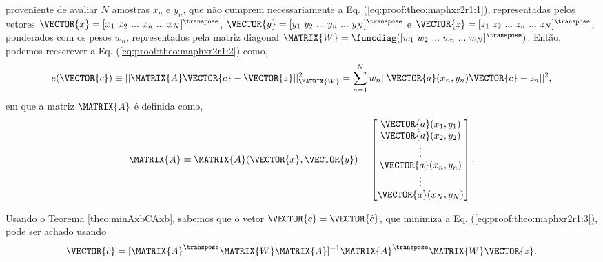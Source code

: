 \begin{myproofT}
\begin{equation}
\end{equation}
proveniente de avaliar $N$ amostras $x_n$ e $y_n$, 
que não cumprem necessariamente a Eq. (\ref{eq:proof:theo:maphxr2r1:1}), 
representadas pelos vetores 
$\VECTOR{x}=[x_1~ x_2~ ...~ x_n~ ...~ x_N]^{\transpose}$,
$\VECTOR{y}=[y_1~ y_2~ ...~ y_n~ ...~ y_N]^{\transpose}$ e 
$\VECTOR{z}=[z_1~ z_2~ ...~ z_n~ ...~ z_N]^{\transpose}$,
ponderados com os pesos $w_n$, representados pela matriz diagonal $\MATRIX{W}=\funcdiag([w_1~ w_2~ ...~ w_n~ ...~ w_N]^{\transpose})$.
Então, podemos reescrever a Eq. (\ref{eq:proof:theo:maphxr2r1:2}) como,
\begin{equation}\label{eq:proof:theo:maphxr2r1:3}
e(\VECTOR{c}) \equiv ||\MATRIX{A}\VECTOR{c}-\VECTOR{z}||_{\MATRIX{W}}^2 =  \sum_{n=1}^{N} w_n||\VECTOR{a}(x_n,y_n)\VECTOR{c}-z_n||^2,
\end{equation}
em que a matriz $\MATRIX{A}$ é definida como,
\begin{equation}\label{eq:proof:maphxr2r1:4}
\MATRIX{A}\equiv \MATRIX{A}(\VECTOR{x},\VECTOR{y})=\begin{bmatrix}
\VECTOR{a}(x_1,y_1)\\
\VECTOR{a}(x_2,y_2)\\
\vdots\\
\VECTOR{a}(x_n,y_n)\\
\vdots\\
\VECTOR{a}(x_N,y_N)
\end{bmatrix}.
\end{equation}


Usando o Teorema \ref{theo:minAxbCAxb}, sabemos que o vetor $\VECTOR{c}=\VECTOR{\hat{c}}$,
que minimiza a Eq. (\ref{eq:proof:theo:maphxr2r1:3}), pode ser achado usando 
\begin{equation}\label{eq:proof:theo:maphxr2r1:5}
\VECTOR{\hat{c}}=[\MATRIX{A}^{\transpose}\MATRIX{W}\MATRIX{A}]^{-1}\MATRIX{A}^{\transpose}\MATRIX{W}\VECTOR{z}.
\end{equation}
\end{myproofT}
